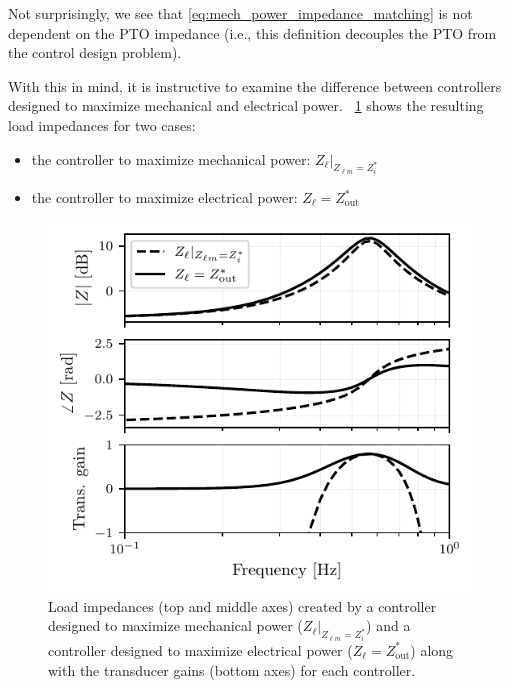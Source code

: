 \documentclass[lettersize,journal]{IEEEtran}
\begin{document}
\noindent{}Not surprisingly, we see that \eqref{eq:mech_power_impedance_matching} is not dependent on the PTO impedance (i.e., this definition decouples the PTO from the control design problem).

With this in mind, it is instructive to examine the difference between controllers designed to maximize mechanical and electrical power.
\figurename~\ref{fig:wec_as_multiport_load_impedance_for_mech_power} shows the resulting load impedances for two cases:

\begin{itemize}
        \item the controller to maximize mechanical power: $Z_\ell \vert_{Z_{\ell m} = Z_i^*}$
        \item the controller to maximize electrical power: $Z_\ell = Z_{\mathrm{out}}^*$
\end{itemize}

\begin{figure}[tb]
        \centering
        \includegraphics[width=1\columnwidth]{wec_as_multiport_load_impedance_for_mech_power_Bode.pdf}
        \caption{Load impedances (top and middle axes) created by a controller designed to maximize mechanical power ($Z_\ell \vert_{Z_{\ell m} = Z_i^*}$) and a controller designed to maximize electrical power ($Z_\ell = Z_{\mathrm{out}}^*$) along with the transducer gains (bottom axes) for each controller.}
        \label{fig:wec_as_multiport_load_impedance_for_mech_power}
\end{figure}
\end{document}
